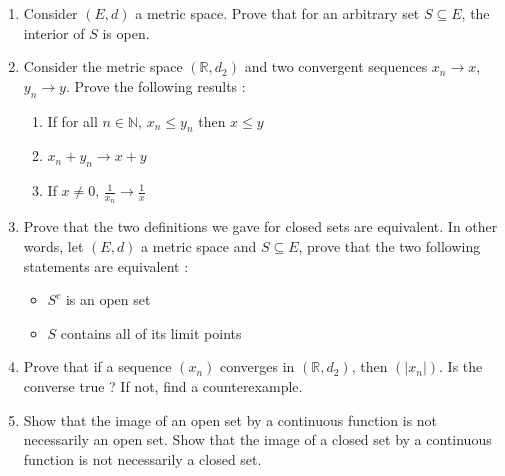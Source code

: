\documentclass[11pt,letterpaper]{scrartcl}
\newcommand{\reals}{\mathbb{R}}
\newcommand{\naturals}{\mathbb{N}}
\begin{document}
\begin{enumerate}
	\item Consider $(E,d)$ a metric space. Prove that for an arbitrary set $S \subseteq E$, the interior of $S$ is open.

	\item Consider the metric space $(\reals,d_2)$ and two convergent sequences $x_n \rightarrow x$, $y_n \rightarrow y$. Prove the following results :
	\begin{enumerate}[label=\alph*.]
		\item If for all $n \in \naturals$, $x_n \leq y_n$ then $x \leq y$
		\item $x_n + y_n \rightarrow x + y$
		\item If $x \neq 0$, $\frac{1}{x_n} \rightarrow \frac{1}{x}$
	\end{enumerate}

	\item Prove that the two definitions we gave for closed sets are equivalent. In other words, let $(E,d)$ a metric space and $S \subseteq E$, prove that the two following statements are equivalent :
	\begin{itemize}
		\item $S^c$ is an open set
		\item $S$ contains all of its limit points
	\end{itemize}

	\item Prove that if a sequence $(x_n)$ converges in $(\reals,d_2)$, then $(|x_n|)$. Is the converse true ? If not, find a counterexample.

	\item Show that the image of an open set by a continuous function is not necessarily an open set. Show that the image of a closed set by a continuous function is not necessarily a closed set.  
	

\end{enumerate}
\end{document}
